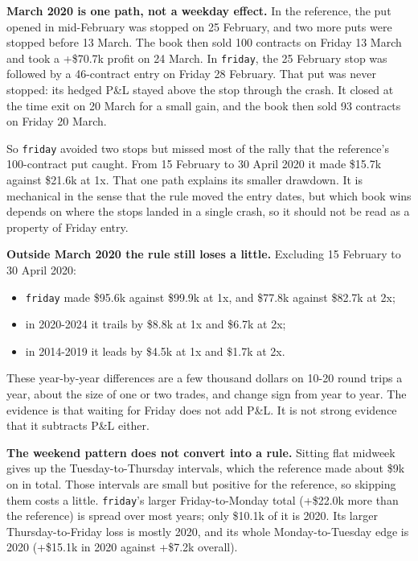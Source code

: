 \documentclass{article}
\begin{document}
\textbf{March 2020 is one path, not a weekday effect.} In the reference, the put opened in mid-February was stopped on 25 February, and two more puts were stopped before 13 March. The book then sold 100 contracts on Friday 13 March and took a +\$70.7k profit on 24 March. In \texttt{friday}, the 25 February stop was followed by a 46-contract entry on Friday 28 February. That put was never stopped: its hedged P\&L stayed above the stop through the crash. It closed at the time exit on 20 March for a small gain, and the book then sold 93 contracts on Friday 20 March.

So \texttt{friday} avoided two stops but missed most of the rally that the reference's 100-contract put caught. From 15 February to 30 April 2020 it made \$15.7k against \$21.6k at 1x. That one path explains its smaller drawdown. It is mechanical in the sense that the rule moved the entry dates, but which book wins depends on where the stops landed in a single crash, so it should not be read as a property of Friday entry.

\textbf{Outside March 2020 the rule still loses a little.} Excluding 15 February to 30 April 2020:

\begin{itemize}

\item \texttt{friday} made \$95.6k against \$99.9k at 1x, and \$77.8k against \$82.7k at 2x;

\item in 2020-2024 it trails by \$8.8k at 1x and \$6.7k at 2x;

\item in 2014-2019 it leads by \$4.5k at 1x and \$1.7k at 2x.

\end{itemize}

These year-by-year differences are a few thousand dollars on 10-20 round trips a year, about the size of one or two trades, and change sign from year to year. The evidence is that waiting for Friday does not add P\&L. It is not strong evidence that it subtracts P\&L either.

\textbf{The weekend pattern does not convert into a rule.} Sitting flat midweek gives up the Tuesday-to-Thursday intervals, which the reference made about \$9k on in total. Those intervals are small but positive for the reference, so skipping them costs a little. \texttt{friday}'s larger Friday-to-Monday total (+\$22.0k more than the reference) is spread over most years; only \$10.1k of it is 2020. Its larger Thursday-to-Friday loss is mostly 2020, and its whole Monday-to-Tuesday edge is 2020 (+\$15.1k in 2020 against +\$7.2k overall).
\end{document}
